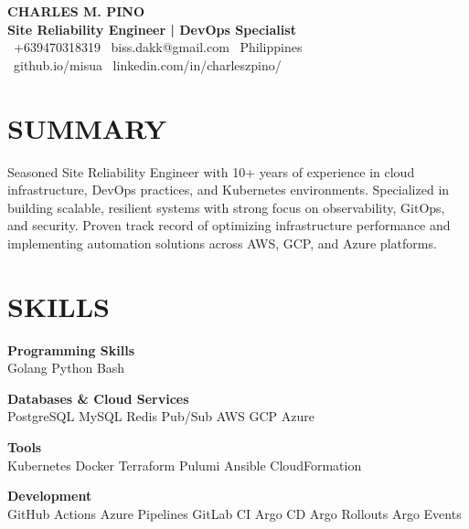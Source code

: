 \documentclass[11pt,a4paper]{article}
\begin{document}
\begin{center}
    {\Huge\textbf{\textcolor{headerblue}{CHARLES M. PINO}}}\\[4pt]
    {\large\textbf{Site Reliability Engineer | DevOps Specialist}}\\[8pt]
    \faPhone\ +639470318319 \quad
    \faEnvelope\ biss.dakk@gmail.com \quad
    \faMapMarker\ Philippines\\[2pt]
    \faGithub\ github.io/misua \quad
    \faLinkedin\ linkedin.com/in/charleszpino/
\end{center}

\vspace{6pt}

\section*{SUMMARY}
Seasoned Site Reliability Engineer with 10+ years of experience in cloud infrastructure, DevOps practices, and Kubernetes environments. Specialized in building scalable, resilient systems with strong focus on observability, GitOps, and security. Proven track record of optimizing infrastructure performance and implementing automation solutions across AWS, GCP, and Azure platforms.

\section*{SKILLS}

\textbf{Programming Skills}\\
Golang \quad Python \quad Bash

\vspace{6pt}

\textbf{Databases \& Cloud Services}\\
PostgreSQL \quad MySQL \quad Redis \quad Pub/Sub \quad AWS \quad GCP \quad Azure

\vspace{6pt}

\textbf{Tools}\\
Kubernetes \quad Docker \quad Terraform \quad Pulumi \quad Ansible \quad CloudFormation

\vspace{6pt}

\textbf{Development}\\
GitHub Actions \quad Azure Pipelines \quad GitLab CI \quad Argo CD \quad Argo Rollouts \quad Argo Events

\vspace{6pt}
\end{document}

